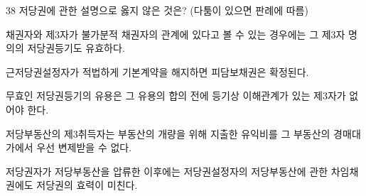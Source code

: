 \begin{question}{38}
저당권에 관한 설명으로 옳지 않은 것은? (다툼이 있으면 판례에 따름)
\begin{choices}
  \item 채권자와 제3자가 불가분적 채권자의 관계에 있다고 볼 수 있는 경우에는 그 제3자 명의의 저당권등기도 유효하다.
  \item 근저당권설정자가 적법하게 기본계약을 해지하면 피담보채권은 확정된다.
  \item 무효인 저당권등기의 유용은 그 유용의 합의 전에 등기상 이해관계가 있는 제3자가 없어야 한다.
  \item 저당부동산의 제3취득자는 부동산의 개량을 위해 지출한 유익비를 그 부동산의 경매대가에서 우선 변제받을 수 없다.
  \item 저당권자가 저당부동산을 압류한 이후에는 저당권설정자의 저당부동산에 관한 차임채권에도 저당권의 효력이 미친다.
\end{choices}
\end{question}
